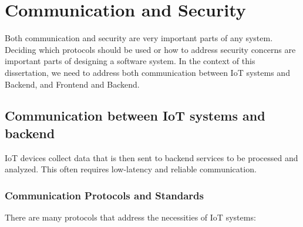 \section{Communication and Security}
Both communication and security are very important parts of any system.
Deciding which protocols should be used or how to address security concerns are
important parts of designing a software system. In the context of this
dissertation, we need to address both communication between \gls{IoT} systems and
Backend, and Frontend and Backend.


\subsection{Communication between IoT systems and backend}
\gls{IoT} devices collect data that is then sent to backend services to be processed
and analyzed. This often requires low-latency and reliable communication.
\subsubsection{Communication Protocols and Standards}
There are many protocols that address the necessities of \gls{IoT} systems:

